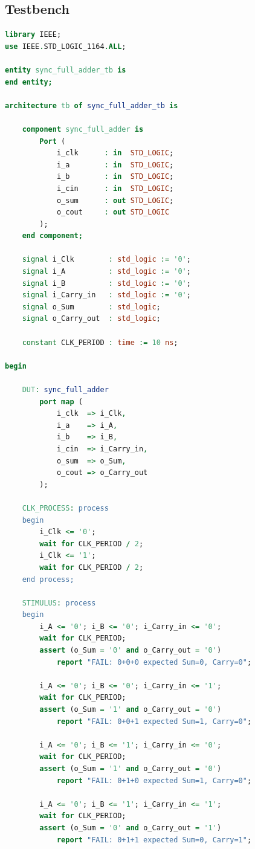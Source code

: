 \documentclass[12pt]{article}
\begin{document}
\subsection*{Testbench}

\begin{lstlisting}[language=VHDL]
library IEEE;
use IEEE.STD_LOGIC_1164.ALL;

entity sync_full_adder_tb is
end entity;

architecture tb of sync_full_adder_tb is

    component sync_full_adder is
        Port (
            i_clk      : in  STD_LOGIC;
            i_a        : in  STD_LOGIC;
            i_b        : in  STD_LOGIC;
            i_cin      : in  STD_LOGIC;
            o_sum      : out STD_LOGIC;
            o_cout     : out STD_LOGIC
        );
    end component;

    signal i_Clk        : std_logic := '0';
    signal i_A          : std_logic := '0';
    signal i_B          : std_logic := '0';
    signal i_Carry_in   : std_logic := '0';
    signal o_Sum        : std_logic;
    signal o_Carry_out  : std_logic;

    constant CLK_PERIOD : time := 10 ns;

begin

    DUT: sync_full_adder
        port map (
            i_clk  => i_Clk,
            i_a    => i_A,
            i_b    => i_B,
            i_cin  => i_Carry_in,
            o_sum  => o_Sum,
            o_cout => o_Carry_out
        );

    CLK_PROCESS: process
    begin
        i_Clk <= '0';
        wait for CLK_PERIOD / 2;
        i_Clk <= '1';
        wait for CLK_PERIOD / 2;
    end process;

    STIMULUS: process
    begin
        i_A <= '0'; i_B <= '0'; i_Carry_in <= '0';
        wait for CLK_PERIOD;
        assert (o_Sum = '0' and o_Carry_out = '0')
            report "FAIL: 0+0+0 expected Sum=0, Carry=0";

        i_A <= '0'; i_B <= '0'; i_Carry_in <= '1';
        wait for CLK_PERIOD;
        assert (o_Sum = '1' and o_Carry_out = '0')
            report "FAIL: 0+0+1 expected Sum=1, Carry=0";

        i_A <= '0'; i_B <= '1'; i_Carry_in <= '0';
        wait for CLK_PERIOD;
        assert (o_Sum = '1' and o_Carry_out = '0')
            report "FAIL: 0+1+0 expected Sum=1, Carry=0";

        i_A <= '0'; i_B <= '1'; i_Carry_in <= '1';
        wait for CLK_PERIOD;
        assert (o_Sum = '0' and o_Carry_out = '1')
            report "FAIL: 0+1+1 expected Sum=0, Carry=1";


\end{lstlisting}
\end{document}
